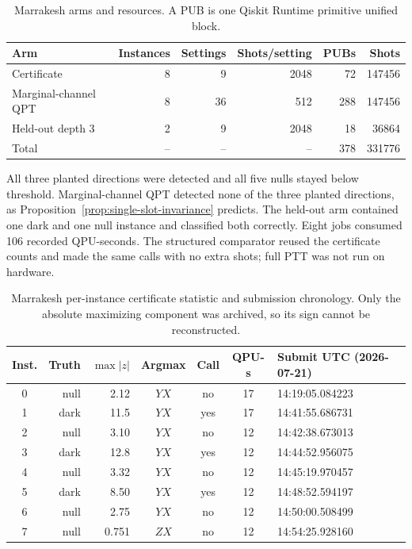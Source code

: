 \documentclass[aps,prl,onecolumn,superscriptaddress,nofootinbib]{revtex4-2}
\begin{document}
\begin{table}[t]
\caption{Marrakesh arms and resources.  A PUB is one Qiskit Runtime primitive unified block.}
\label{tab:marrakesh-arms}
\begin{ruledtabular}
\begin{tabular}{lrrrrr}
Arm & Instances & Settings & Shots/setting & PUBs & Shots\\
\hline
Certificate & 8 & 9 & 2048 & 72 & 147456\\
Marginal-channel QPT & 8 & 36 & 512 & 288 & 147456\\
Held-out depth 3 & 2 & 9 & 2048 & 18 & 36864\\
\hline
Total & -- & -- & -- & 378 & 331776\\
\end{tabular}
\end{ruledtabular}
\end{table}

All three planted directions were detected and all five nulls stayed below threshold.  Marginal-channel QPT detected none of the three planted directions, as Proposition~\ref{prop:single-slot-invariance} predicts.  The held-out arm contained one dark and one null instance and classified both correctly.  Eight jobs consumed 106 recorded QPU-seconds.  The structured comparator reused the certificate counts and made the same calls with no extra shots; full PTT was not run on hardware.

\begin{table}[t]
\caption{Marrakesh per-instance certificate statistic and submission chronology.  Only the absolute maximizing component was archived, so its sign cannot be reconstructed.}
\label{tab:marrakesh-instances}
\scriptsize
\begin{ruledtabular}
\begin{tabular}{crrcccl}
Inst. & Truth & $\max|z|$ & Argmax & Call & QPU-s & Submit UTC (2026-07-21)\\
\hline
0 & null & 2.12 & $YX$ & no & 17 & 14:19:05.084223\\
1 & dark & 11.5 & $YX$ & yes & 17 & 14:41:55.686731\\
2 & null & 3.10 & $YX$ & no & 12 & 14:42:38.673013\\
3 & dark & 12.8 & $YX$ & yes & 12 & 14:44:52.956075\\
4 & null & 3.32 & $YX$ & no & 12 & 14:45:19.970457\\
5 & dark & 8.50 & $YX$ & yes & 12 & 14:48:52.594197\\
6 & null & 2.75 & $YX$ & no & 12 & 14:50:00.508499\\
7 & null & 0.751 & $ZX$ & no & 12 & 14:54:25.928160\\
\end{tabular}
\end{ruledtabular}
\end{table}
\end{document}
